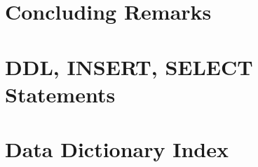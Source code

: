 \documentclass[a4paper,11pt]{article}
\begin{document}
\section{Concluding Remarks}



\pagebreak

\appendix
\section{DDL, INSERT, SELECT Statements}

\section{Data Dictionary Index}
\end{document}
